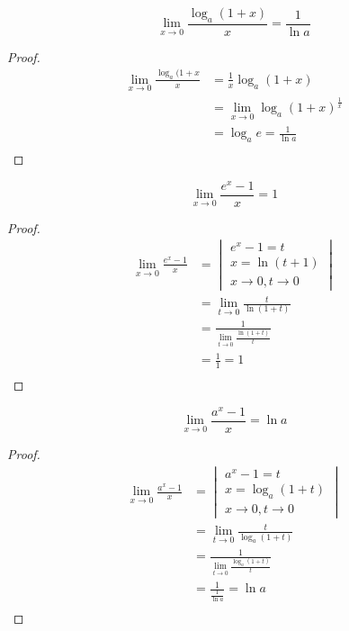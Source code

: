 \begin{corollary}
  \[
    \lim_{x \to 0} \frac{\log_a(1 + x)}{x} = \frac{1}{\ln a}
  \] 
\end{corollary}
\begin{proof}
  \begin{align*}
    \lim_{x \to 0} \frac{\log_a(1 + x}{x} &= \frac{1}{x} \log_a(1 + x) \\
      &= \lim_{x \to 0} \log_a(1 + x)^{\frac{1}{x}} \\
      &= \log_a e = \frac{1}{\ln a} \\
  \end{align*} 
\end{proof}

\begin{corollary}
  \[
     \lim_{x \to 0} \frac{e^x - 1}{x} = 1
  \] 
\end{corollary}
\begin{proof}
\begin{align*}
    \lim_{x \to 0} \frac{e^x - 1}{x} &= 
    \begin{vmatrix}
      e^x - 1 = t \\
      x = \ln(t + 1) \\
      x \to 0, t \to  0
    \end{vmatrix}
    \\
    &= \lim_{t \to 0} \frac{t}{\ln(1 + t)} \\
    &= \frac{1}{\lim_{t \to 0} \frac{\ln(1 + t)}{t} }\\
    &= \frac{1}{1} = 1 \\
\end{align*} 
\end{proof}

\begin{corollary}
  \[
    \lim_{x \to 0} \frac{a^x - 1}{x} = \ln a
  \] 
\end{corollary}
\begin{proof}
  \begin{align*}
    \lim_{x \to 0} \frac{a^x - 1}{x} &= 
    \begin{vmatrix}
      a^x - 1 = t \\
      x = \log_a(1 + t) \\
      x \to 0, t \to 0
    \end{vmatrix} \\
    &= \lim_{t \to 0} \frac{t}{\log_a(1 + t)} \\
    &= \frac{1}{\lim_{t \to 0} \frac{\log_a(1 + t)}{t}} \\
    &= \frac{1}{\frac{1}{\ln a}} = \ln a \\
  \end{align*}
\end{proof}

